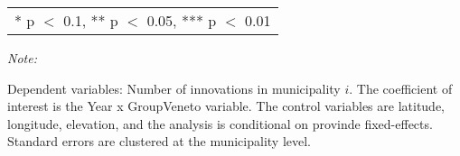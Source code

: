 \begin{table}[!h]
\begin{threeparttable}
\begin{tabular}[t]{lcccc}
\bottomrule
\multicolumn{5}{l}{\rule{0pt}{1em}* p $<$ 0.1, ** p $<$ 0.05, *** p $<$ 0.01}\\
\end{tabular}
\begin{tablenotes}[para]
\item \textit{Note: } 
\item Dependent variables: Number of innovations in municipality $i$. The coefficient of interest is the Year x Group{Veneto} variable. The control variables are latitude, longitude, elevation, and the analysis is conditional on provinde fixed-effects. Standard errors are clustered at the municipality level.
\end{tablenotes}
\end{threeparttable}
\end{table}
